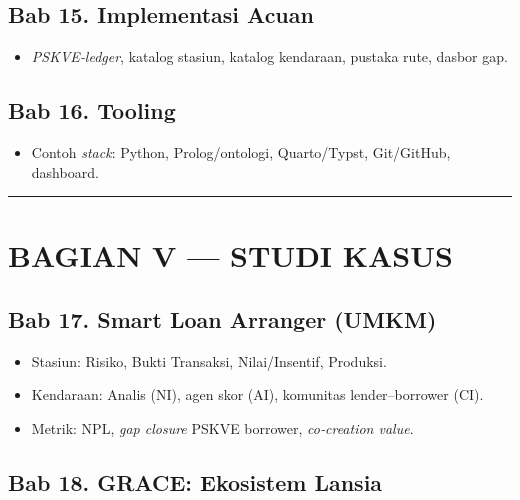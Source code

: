 \documentclass[
  letterpaper,
  DIV=11,
  numbers=noendperiod]{scrartcl}
\providecommand{\tightlist}{%
  \setlength{\itemsep}{0pt}\setlength{\parskip}{0pt}}
\begin{document}
\subsection{Bab 15. Implementasi
Acuan}\label{bab-15.-implementasi-acuan}

\begin{itemize}
\tightlist
\item
  \emph{PSKVE‑ledger}, katalog stasiun, katalog kendaraan, pustaka rute,
  dasbor gap.
\end{itemize}

\subsection{Bab 16. Tooling}\label{bab-16.-tooling}

\begin{itemize}
\tightlist
\item
  Contoh \emph{stack}: Python, Prolog/ontologi, Quarto/Typst,
  Git/GitHub, dashboard.
\end{itemize}

\begin{center}\rule{0.5\linewidth}{0.5pt}\end{center}

\section{BAGIAN V --- STUDI KASUS}\label{bagian-v-studi-kasus}

\subsection{Bab 17. Smart Loan Arranger
(UMKM)}\label{bab-17.-smart-loan-arranger-umkm}

\begin{itemize}
\tightlist
\item
  Stasiun: Risiko, Bukti Transaksi, Nilai/Insentif, Produksi.
\item
  Kendaraan: Analis (NI), agen skor (AI), komunitas lender--borrower
  (CI).
\item
  Metrik: NPL, \emph{gap closure} PSKVE borrower, \emph{co‑creation
  value}.
\end{itemize}

\subsection{Bab 18. GRACE: Ekosistem
Lansia}\label{bab-18.-grace-ekosistem-lansia}
\end{document}
